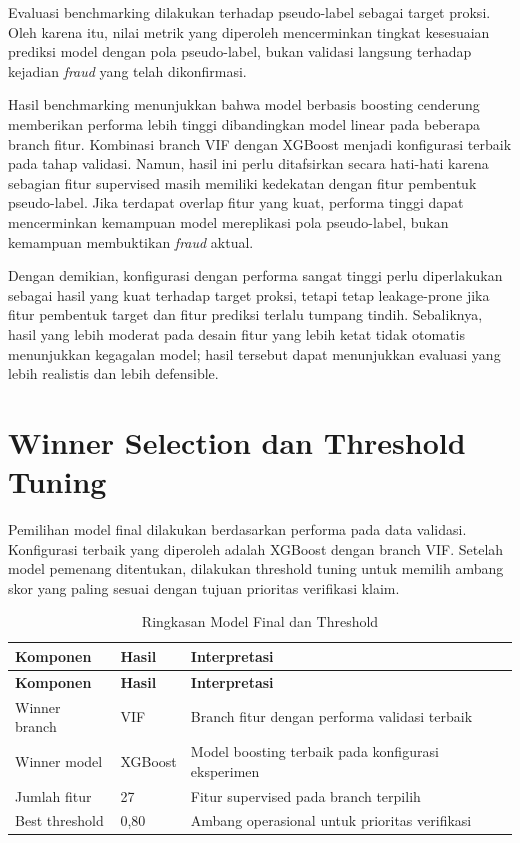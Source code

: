 Evaluasi benchmarking dilakukan terhadap pseudo-label sebagai target proksi. Oleh karena itu, nilai metrik yang diperoleh mencerminkan tingkat kesesuaian prediksi model dengan pola pseudo-label, bukan validasi langsung terhadap kejadian \emph{fraud} yang telah dikonfirmasi.

Hasil benchmarking menunjukkan bahwa model berbasis boosting cenderung memberikan performa lebih tinggi dibandingkan model linear pada beberapa branch fitur. Kombinasi branch VIF dengan XGBoost menjadi konfigurasi terbaik pada tahap validasi. Namun, hasil ini perlu ditafsirkan secara hati-hati karena sebagian fitur supervised masih memiliki kedekatan dengan fitur pembentuk pseudo-label. Jika terdapat overlap fitur yang kuat, performa tinggi dapat mencerminkan kemampuan model mereplikasi pola pseudo-label, bukan kemampuan membuktikan \emph{fraud} aktual.

Dengan demikian, konfigurasi dengan performa sangat tinggi perlu diperlakukan sebagai hasil yang kuat terhadap target proksi, tetapi tetap leakage-prone jika fitur pembentuk target dan fitur prediksi terlalu tumpang tindih. Sebaliknya, hasil yang lebih moderat pada desain fitur yang lebih ketat tidak otomatis menunjukkan kegagalan model; hasil tersebut dapat menunjukkan evaluasi yang lebih realistis dan lebih defensible.

\section{Winner Selection dan Threshold Tuning}\label{winner-selection-dan-threshold-tuning}

Pemilihan model final dilakukan berdasarkan performa pada data validasi. Konfigurasi terbaik yang diperoleh adalah XGBoost dengan branch VIF. Setelah model pemenang ditentukan, dilakukan threshold tuning untuk memilih ambang skor yang paling sesuai dengan tujuan prioritas verifikasi klaim.

\begin{longtable}[]{@{}p{}p{}p{}@{}}
\caption{Ringkasan Model Final dan Threshold}\label{tab:model-final-threshold}\\
\toprule
\textbf{Komponen} & \textbf{Hasil} & \textbf{Interpretasi} \\
\midrule
\endfirsthead
\toprule
\textbf{Komponen} & \textbf{Hasil} & \textbf{Interpretasi} \\
\midrule
\endhead
\bottomrule
\endfoot
Winner branch & VIF & Branch fitur dengan performa validasi terbaik \\
Winner model & XGBoost & Model boosting terbaik pada konfigurasi eksperimen \\
Jumlah fitur & 27 & Fitur supervised pada branch terpilih \\
Best threshold & 0,80 & Ambang operasional untuk prioritas verifikasi \\
\end{longtable}

